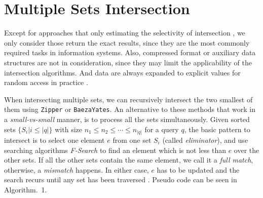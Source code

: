 \section{Multiple Sets Intersection}\label{sec: msis}
Except for approaches that only estimating the selectivity of intersection \cite{Takuma2013Faster}, we only consider those return the exact results, since they are the most commonly required tasks in information systems.
Also, compressed format or auxiliary data structures are not in consideration, since they may limit the applicability of the intersection algorithms.
And data are always expanded to explicit values for random access in practice \cite{Culpepper2007Compact,sanders2007intersection}.

When intersecting multiple sets, we can recursively intersect the two smallest of them using \texttt{Zipper} or \texttt{BaezaYates}.
An alternative to these methods that work in a \textit{small-vs-small} manner, is to process all the sets simultaneously.
Given sorted sets $ \{S_i|i\leqslant\lvert q \rvert\} $ with size $ n_1\leqslant n_2\leqslant\cdots\leqslant n_{\lvert q\rvert} $ for a query $ q $, the basic pattern to intersect is to select one element $ e $ from one set $ S_i $ (called \textit{eliminator}), and use searching algorithms \textit{F-Search} to find an element which is not less than $ e $ over the other sets.
If all the other sets contain the same element, we call it a \textit{full match}, otherwise, a \textit{mismatch} happens.
In either case, $ e $ has to be updated and the search recurs until any set has been traversed \cite{culpepper2010efficient}.
Pseudo code can be seen in Algorithm.~1.

